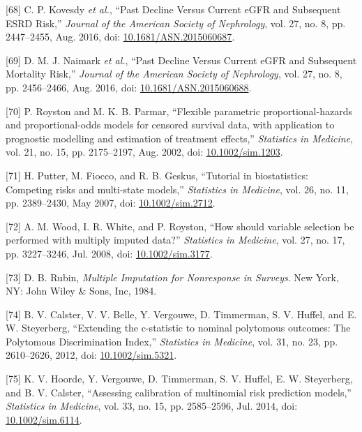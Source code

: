 \documentclass[12pt,twoside]{reedthesis}
\newenvironment{cslreferences}%
  {}%
  {\par}
\begin{document}
\begin{cslreferences}
\leavevmode\hypertarget{ref-kovesdy_past_2016}{}%
{[}68{]} C. P. Kovesdy \emph{et al.}, ``Past Decline Versus Current eGFR and Subsequent ESRD Risk,'' \emph{Journal of the American Society of Nephrology}, vol. 27, no. 8, pp. 2447--2455, Aug. 2016, doi: \href{https://doi.org/10.1681/ASN.2015060687}{10.1681/ASN.2015060687}.

\leavevmode\hypertarget{ref-naimark_past_2016}{}%
{[}69{]} D. M. J. Naimark \emph{et al.}, ``Past Decline Versus Current eGFR and Subsequent Mortality Risk,'' \emph{Journal of the American Society of Nephrology}, vol. 27, no. 8, pp. 2456--2466, Aug. 2016, doi: \href{https://doi.org/10.1681/ASN.2015060688}{10.1681/ASN.2015060688}.

\leavevmode\hypertarget{ref-royston_flexible_2002}{}%
{[}70{]} P. Royston and M. K. B. Parmar, ``Flexible parametric proportional-hazards and proportional-odds models for censored survival data, with application to prognostic modelling and estimation of treatment effects,'' \emph{Statistics in Medicine}, vol. 21, no. 15, pp. 2175--2197, Aug. 2002, doi: \href{https://doi.org/10.1002/sim.1203}{10.1002/sim.1203}.

\leavevmode\hypertarget{ref-putter_tutorial_2007}{}%
{[}71{]} H. Putter, M. Fiocco, and R. B. Geskus, ``Tutorial in biostatistics: Competing risks and multi-state models,'' \emph{Statistics in Medicine}, vol. 26, no. 11, pp. 2389--2430, May 2007, doi: \href{https://doi.org/10.1002/sim.2712}{10.1002/sim.2712}.

\leavevmode\hypertarget{ref-wood_how_2008}{}%
{[}72{]} A. M. Wood, I. R. White, and P. Royston, ``How should variable selection be performed with multiply imputed data?'' \emph{Statistics in Medicine}, vol. 27, no. 17, pp. 3227--3246, Jul. 2008, doi: \href{https://doi.org/10.1002/sim.3177}{10.1002/sim.3177}.

\leavevmode\hypertarget{ref-rubin_multiple_1984}{}%
{[}73{]} D. B. Rubin, \emph{Multiple Imputation for Nonresponse in Surveys}. New York, NY: John Wiley \& Sons, Inc, 1984.

\leavevmode\hypertarget{ref-calster_extending_2012-1}{}%
{[}74{]} B. V. Calster, V. V. Belle, Y. Vergouwe, D. Timmerman, S. V. Huffel, and E. W. Steyerberg, ``Extending the c-statistic to nominal polytomous outcomes: The Polytomous Discrimination Index,'' \emph{Statistics in Medicine}, vol. 31, no. 23, pp. 2610--2626, 2012, doi: \href{https://doi.org/10.1002/sim.5321}{10.1002/sim.5321}.

\leavevmode\hypertarget{ref-hoorde_assessing_2014}{}%
{[}75{]} K. V. Hoorde, Y. Vergouwe, D. Timmerman, S. V. Huffel, E. W. Steyerberg, and B. V. Calster, ``Assessing calibration of multinomial risk prediction models,'' \emph{Statistics in Medicine}, vol. 33, no. 15, pp. 2585--2596, Jul. 2014, doi: \href{https://doi.org/10.1002/sim.6114}{10.1002/sim.6114}.
\end{cslreferences}

\end{document}
